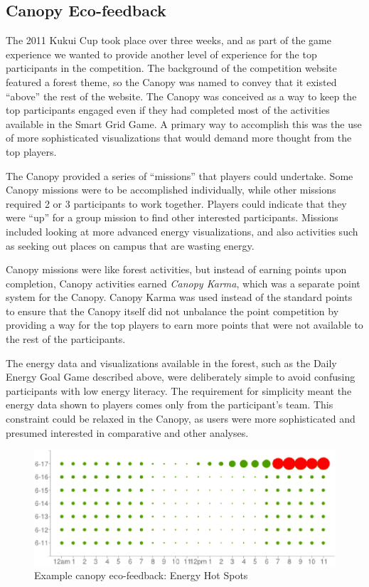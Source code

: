 \documentclass{sigchi}
\begin{document}
\subsection{Canopy Eco-feedback}

The 2011 Kukui Cup took place over three weeks, and as part of the game experience we wanted to provide another level of experience for the top participants in the competition. The background of the competition website featured a forest theme, so the Canopy was named to convey that it existed ``above'' the rest of the website. The Canopy was conceived as a way to keep the top participants engaged even if they had completed most of the activities available in the Smart Grid Game.  A primary way to accomplish this was the use of more sophisticated visualizations that would demand more thought from the top players. 

The Canopy provided a series of ``missions'' that players could undertake. Some Canopy missions were to be accomplished individually, while other missions required 2 or 3 participants to work together. Players could indicate that they were ``up'' for a group mission to find other interested participants. Missions included looking at more advanced energy visualizations, and also activities such as seeking out places on campus that are wasting energy.

Canopy missions were like forest activities, but instead of earning points upon completion, Canopy activities earned \emph{Canopy Karma}, which was a separate point system for the Canopy. Canopy Karma was used instead of the standard points to ensure that the Canopy itself did not unbalance the point competition by providing a way for the top players to earn more points that were not available to the rest of the participants.

The energy data and visualizations available in the forest, such as the Daily Energy Goal Game described above, were deliberately simple to avoid confusing participants with low energy literacy.  The requirement for simplicity meant the energy data shown to players comes only from the participant's team. This constraint could be relaxed in the Canopy, as users were more sophisticated and presumed interested in comparative and other analyses.

\begin{figure}[!t]
\centering
\includegraphics[width=0.95\columnwidth]{hot-spots-crop.eps}
\caption{Example canopy eco-feedback: Energy Hot Spots}
\label{fig:hot-spots}
\end{figure}
\end{document}
